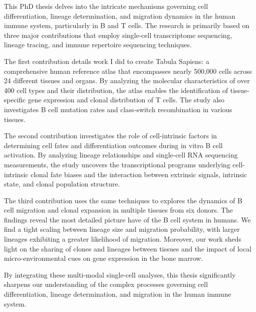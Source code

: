 This PhD thesis delves into the intricate mechanisms governing cell differentiation, lineage determination, and migration dynamics in the human immune system, particularly in B and T cells. The research is primarily based on three major contributions that employ single-cell transcriptome sequencing, lineage tracing, and immune repertoire sequencing techniques.

The first contribution details work I did to create Tabula Sapiens: a comprehensive human reference atlas that encompasses nearly 500,000 cells across 24 different tissues and organs. By analyzing the molecular characteristics of over 400 cell types and their distribution, the atlas enables the identification of tissue-specific gene expression and clonal distribution of T cells. The study also investigates B cell mutation rates and class-switch recombination in various tissues.

The second contribution investigates the role of cell-intrinsic factors in determining cell fates and differentiation outcomes during in vitro B cell activation. By analyzing lineage relationships and single-cell RNA sequencing measurements, the study uncovers the transcriptional programs underlying cell-intrinsic clonal fate biases and the interaction between extrinsic signals, intrinsic state, and clonal population structure. 

The third contribution uses the same techniques to explores the dynamics of B cell migration and clonal expansion in multiple tissues from six donors. The findings reveal the most detailed picture have of the B cell system in humans. We find a tight scaling between lineage size and migration probability, with larger lineages exhibiting a greater likelihood of migration. Moreover, our work sheds light on the sharing of clones and lineages between tissues and the impact of local micro-environmental cues on gene expression in the bone marrow.

By integrating these multi-modal single-cell analyses, this thesis significantly sharpens our understanding of the complex processes governing cell differentiation, lineage determination, and migration in the human immune system. 
